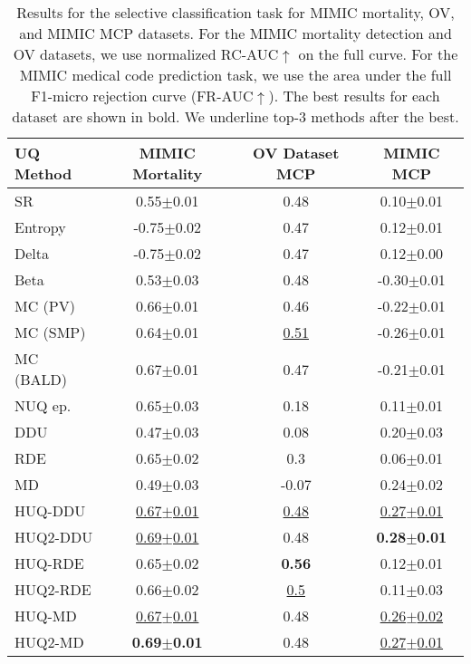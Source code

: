 \begin{table*}[!ht] \centering%
\begin{tabular}{l|c|c|c}
\toprule
\textbf{UQ Method} & \textbf{MIMIC Mortality} & \textbf{OV Dataset MCP} & \textbf{MIMIC MCP} \\
\midrule
SR & 0.55$\pm$0.01 & 0.48 & 0.10$\pm$0.01 \\
Entropy & -0.75$\pm$0.02 & 0.47 & 0.12$\pm$0.01 \\
Delta & -0.75$\pm$0.02 & 0.47 & 0.12$\pm$0.00 \\
Beta & 0.53$\pm$0.03 & 0.48 & -0.30$\pm$0.01 \\\midrule
MC (PV) & 0.66$\pm$0.01 & 0.46 & -0.22$\pm$0.01 \\
MC (SMP) & 0.64$\pm$0.01 & \underline{0.51} & -0.26$\pm$0.01 \\
MC (BALD) & 0.67$\pm$0.01 & 0.47 & -0.21$\pm$0.01 \\\midrule
NUQ ep. & 0.65$\pm$0.03 & 0.18 & 0.11$\pm$0.01 \\
DDU & 0.47$\pm$0.03 & 0.08 & 0.20$\pm$0.03 \\
RDE & 0.65$\pm$0.02 & 0.3 & 0.06$\pm$0.01 \\
MD & 0.49$\pm$0.03 & -0.07 & 0.24$\pm$0.02 \\\midrule
HUQ-DDU & \underline{0.67$\pm$0.01} & \underline{0.48} & \underline{0.27$\pm$0.01} \\
HUQ2-DDU & \underline{0.69$\pm$0.01} & 0.48 & \textbf{0.28$\pm$0.01} \\
HUQ-RDE & 0.65$\pm$0.02 & \textbf{0.56} & 0.12$\pm$0.01 \\
HUQ2-RDE & 0.66$\pm$0.02 & \underline{0.5} & 0.11$\pm$0.03 \\
HUQ-MD & \underline{0.67$\pm$0.01} & 0.48 & \underline{0.26$\pm$0.02} \\
HUQ2-MD & \textbf{0.69$\pm$0.01} & 0.48 & \underline{0.27$\pm$0.01} \\
\bottomrule
\end{tabular}
\caption{\label{tab:mimic_100} Results for the selective classification task for MIMIC mortality, OV, and MIMIC MCP  datasets. For the MIMIC mortality detection and OV datasets, we use normalized RC-AUC$\uparrow$ on the full curve. For the MIMIC medical code prediction task, we use the area under the full F1-micro rejection curve (FR-AUC$\uparrow$). The best results for each dataset are shown in bold. We underline top-3 methods after the best.}
\end{table*}